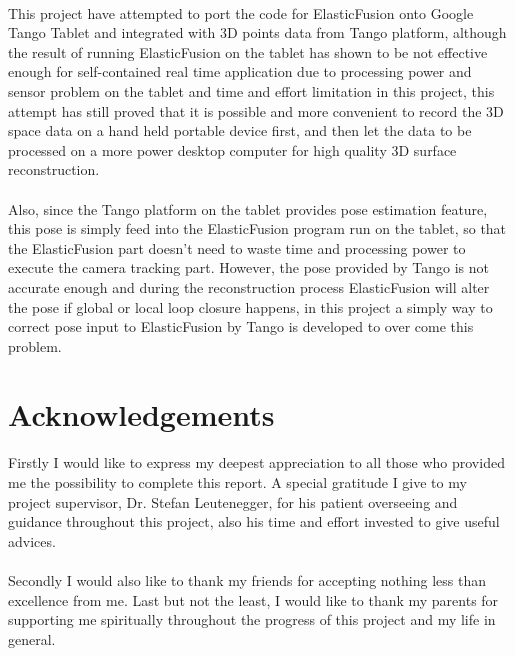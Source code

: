 \documentclass[12pt,twoside]{article}
\begin{document}
\\
This project have attempted to port the code for ElasticFusion onto Google Tango Tablet and integrated with 3D points data from Tango platform, although the result of running ElasticFusion on the tablet has shown to be not effective enough for self-contained real time application due to processing power and sensor problem on the tablet and time and effort limitation in this project, this attempt has still proved that it is possible and more convenient to record the 3D space data on a hand held portable device first, and then let the data to be processed on a more power desktop computer for high quality 3D surface reconstruction.\\
\\
Also, since the Tango platform on the tablet provides pose estimation feature, this pose is simply feed into the ElasticFusion program run on the tablet, so that the ElasticFusion part doesn't need to waste time and processing power to execute the camera tracking part. However, the pose provided by Tango is not accurate enough and during the reconstruction process ElasticFusion will alter the pose if global or local loop closure happens, in this project a simply way to correct pose input to ElasticFusion by Tango is developed to  over come this problem. 


\newpage

\section{Acknowledgements}
Firstly I would like to express my deepest appreciation to all those who provided me the possibility to complete this report. A special gratitude I give to my project supervisor, Dr. Stefan Leutenegger, for his patient overseeing and guidance throughout this project, also his time and effort invested to give useful advices.\\
\\
Secondly I would also like to thank my friends for accepting nothing less than excellence from me. Last but not the least, I would like to thank my parents for supporting me spiritually throughout the progress of this project and my life in general.

\newpage


\tableofcontents

\end{document}
